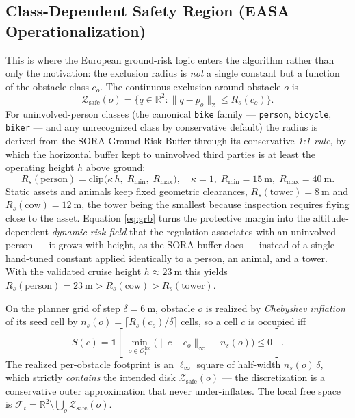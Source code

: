 \subsection{Class-Dependent Safety Region (EASA Operationalization)}
This is where the European ground-risk logic enters the algorithm rather than
only the motivation: the exclusion radius is \emph{not} a single constant but a
function of the obstacle class $c_o$. The continuous exclusion around obstacle
$o$ is
\begin{equation}
\mathcal{Z}_{\text{safe}}(o)=\{q\in\mathbb{R}^2:\lVert q-p_o\rVert_2\le R_s(c_o)\}.
\end{equation}
For uninvolved-person classes (the canonical \texttt{bike} family ---
\texttt{person}, \texttt{bicycle}, \texttt{biker} --- and any unrecognized class
by conservative default) the radius is derived from the SORA Ground Risk Buffer
through its conservative \emph{1:1 rule}, by which the horizontal buffer kept to
uninvolved third parties is at least the operating height $h$ above ground:
\begin{equation}
R_s(\text{person})=\mathrm{clip}\!\big(\kappa\,h,\;R_{\min},\;R_{\max}\big),
\quad \kappa=1,\;R_{\min}=\SI{15}{\meter},\;R_{\max}=\SI{40}{\meter}.
\label{eq:grb}
\end{equation}
Static assets and animals keep fixed geometric clearances,
$R_s(\text{tower})=\SI{8}{\meter}$ and $R_s(\text{cow})=\SI{12}{\meter}$, the
tower being the smallest because inspection requires flying close to the asset.
Equation \eqref{eq:grb} turns the protective margin into the
altitude-dependent \emph{dynamic risk field} that the regulation associates with
an uninvolved person --- it grows with height, as the SORA buffer does --- instead
of a single hand-tuned constant applied identically to a person, an animal, and a
tower. With the validated cruise height $h\approx\SI{23}{\meter}$ this yields
$R_s(\text{person})=\SI{23}{\meter}>R_s(\text{cow})>R_s(\text{tower})$.

On the planner grid of step $\delta=\SI{6}{\meter}$, obstacle $o$ is realized by
\emph{Chebyshev inflation} of its seed cell by $n_s(o)=\lceil R_s(c_o)/\delta\rceil$
cells, so a cell $c$ is occupied iff
\begin{equation}
S(c)=\mathbf 1\!\left[\;\min_{o\in\mathcal{O}^{\text{loc}}_t}
\big(\lVert c-c_{o}\rVert_\infty - n_s(o)\big)\le 0\;\right].
\label{eq:occupancy}
\end{equation}
The realized per-obstacle footprint is an $\ell_\infty$ square of half-width
$n_s(o)\,\delta$, which strictly \emph{contains} the intended disk
$\mathcal{Z}_{\text{safe}}(o)$ --- the discretization is a conservative outer
approximation that never under-inflates. The local free space is
$\mathcal{F}_t=\mathbb{R}^2\setminus\bigcup_{o}\mathcal{Z}_{\text{safe}}(o)$.

